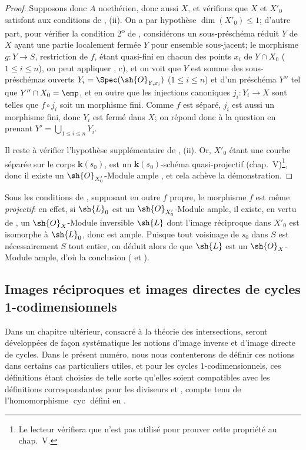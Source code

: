 \begin{proof}
Supposons donc $A$ noethérien, donc aussi $X$, et vérifions que $X$ et $X'_0$ satisfont aux conditions de , (ii).
On a par hypothèse $\dim(X'_0)\leq1$;
d'autre part, pour vérifier la condition 2\textsuperscript{o} de , considérons un sous-préschéma réduit $Y$ de $X$ ayant une partie localement fermée $Y$ pour ensemble sous-jacent;
le morphisme $g:Y\to S$, restriction de $f$, étant quasi-fini en chacun des points $x_i$ de $Y\cap X_0$ ($1\leq i\leq n$), on peut appliquer , c), et on voit que $Y$ est somme des sous-préschémas ouverts $Y_i=\Spec(\sh{O}_{Y,x_i})$ ($1\leq i\leq n$) et d'un préschéma $Y''$ tel que $Y''\cap X_0=\emp$, et en outre que les injections canoniques $j_i:Y_i\to X$ sont telles que $f\circ j_i$ soit un morphisme fini.
Comme $f$ est séparé, $j_i$ est aussi un morphisme fini, donc $Y_i$ est fermé dans $X$;
on répond donc à la question en prenant $Y'=\bigcup_{1\leq i\leq n}Y_i$.

Il reste à vérifier l'hypothèse supplémentaire de , (ii).
Or, $X'_0$ étant une courbe séparée sur le corps $\boldsymbol{k}(s_0)$, est un $\boldsymbol{k}(s_0)$-schéma quasi-projectif (chap.~V)\footnote{Le lecteur vérifiera que  n'est pas utilisé pour prouver cette propriété au chap.~V.}, donc il existe un $\sh{O}_{X'_0}$-Module ample , et cela achève la démonstration.
\end{proof}

\begin{remark}[21.9.13]
\label{IV.21.9.13}
Sous les conditions de , supposant en outre $f$ propre, le morphisme $f$ est même \emph{projectif}:
en effet, si $\sh{L}_0$ est un $\sh{O}_{X'_0}$-Module ample, il existe, en vertu de , un $\sh{O}_X$-Module inversible $\sh{L}$ dont l'image réciproque dans $X'_0$ est isomorphe à $\sh{L}_0$, donc est ample.
Puisque tout voisinage de $s_0$ dans $S$ est nécessairement $S$ tout entier, on déduit alors de  que $\sh{L}$ est un $\sh{O}_X$-Module ample, d'où la conclusion ( et ).
\end{remark}

\subsection{Images réciproques et images directes de cycles 1-codimensionnels}
\label{subsection:IV.21.10}

Dans un chapitre ultérieur, consacré à la théorie des intersections, seront développées de façon systématique les notions d'image inverse et d'image directe de cycles.
Dans le présent numéro, nous nous contenterons de définir ces notions dans certains cas particuliers utiles, et pour les cycles $1$-codimensionnels, ces définitions étant choisies de telle sorte qu'elles soient compatibles avec les définitions correspondantes pour les diviseurs  et , compte tenu de l'homomorphisme $\operatorname{cyc}$ défini en .

